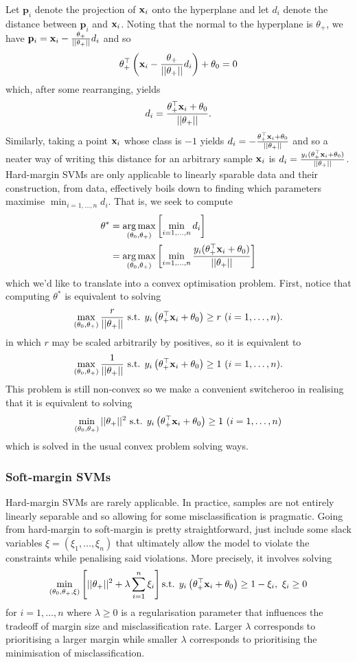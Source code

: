 \documentclass[11pt]{article}
\begin{document}
Let $\mathbf{p}_i$ denote the projection of $\mathbf{x}_i$ onto the hyperplane and let $d_i$ denote the distance between $\mathbf{p}_i$ and $\mathbf{x}_i$. Noting that the normal to the hyperplane is $\theta_+$, we have $\mathbf{p}_i=\mathbf{x}_i-\frac{\theta_+}{||\theta_+||}d_i$ and so
$$
\theta_+^\top \left(\mathbf{x}_i-\frac{\theta_+}{||\theta_+||}d_i\right)+\theta_0
=
0
$$
which, after some rearranging, yields
$$
d_i
=
\frac{\theta_+^\top \mathbf{x}_i+\theta_0}{||\theta_+||}.
$$
Similarly, taking a point $\mathbf{x}_i$ whose class is $-1$ yields $d_i=-\frac{\theta_+^\top \mathbf{x}_i+\theta_0}{||\theta_+||}$ and so a neater way of writing this distance for an arbitrary sample $\mathbf{x}_i$ is $d_i=\frac{y_i(\theta_+^\top \mathbf{x}_i+\theta_0)}{||\theta_+||}$. Hard-margin SVMs are only applicable to linearly sparable data and their construction, from data, effectively boils down to finding which parameters maximise $\min_{i=1,\dots,n}d_i$. That is, we seek to compute
\begin{align*}
    \theta^{*}
    &=
    \operatorname*{arg\,max}_{(\theta_0,\theta_+)}\left[\min_{i=1,\dots,n}d_i\right]\\
    &=
    \operatorname*{arg\,max}_{(\theta_0,\theta_+)}\left[\min_{i=1,\dots,n}\frac{y_i(\theta_+^\top \mathbf{x}_i+\theta_0)}{||\theta_+||}\right]
\end{align*}
which we'd like to translate into a convex optimisation problem. First, notice that computing $\theta^{*}$ is equivalent to solving
$$
\max_{(\theta_0,\theta_+)}\frac{r}{||\theta_+||}\text{ s.t. } y_i\left(\theta_+^\top \mathbf{x}_i+\theta_0\right)\geq r\text{ } (i=1,\dots,n).
$$
in which $r$ may be scaled arbitrarily by positives, so it is equivalent to
$$
\max_{(\theta_0,\theta_+)}\frac{1}{||\theta_+||}\text{ s.t. } y_i\left(\theta_+^\top \mathbf{x}_i+\theta_0\right)\geq 1\text{ } (i=1,\dots,n).
$$
This problem is still non-convex so we make a convenient switcheroo in realising that it is equivalent to solving
$$
\min_{(\theta_0,\theta_+)}||\theta_+||^2\text{ s.t. } y_i\left(\theta_+^\top \mathbf{x}_i+\theta_0\right)\geq 1\text{ } (i=1,\dots,n)
$$
which is solved in the usual convex problem solving ways.

\subsubsection{Soft-margin SVMs}

Hard-margin SVMs are rarely applicable. In practice, samples are not entirely linearly separable and so allowing for some misclassification is pragmatic. Going from hard-margin to soft-margin is pretty straightforward, just include some slack variables $\xi=(\xi_1,\dots,\xi_n)$ that ultimately allow the model to violate the constraints while penalising said violations. More precisely, it involves solving
$$
\min_{(\theta_0,\theta_+,\xi)}\left[||\theta_+||^2+\lambda\sum_{i=1}^n\xi_i\right]\text{s.t. } y_i\left(\theta_+^\top \mathbf{x}_i+\theta_0\right)\geq 1-\xi_i,\text{ }\xi_i\geq0
$$
for $i=1,\dots,n$ where $\lambda\geq0$ is a regularisation parameter that influences the tradeoff of margin size and misclassification rate. Larger $\lambda$ corresponds to prioritising a larger margin while smaller $\lambda$ corresponds to prioritising the minimisation of misclassification.
\end{document}
